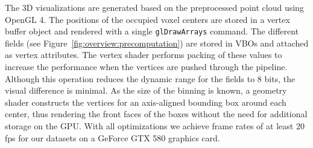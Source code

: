 \documentclass[conference,10pt,letter]{IEEEtran}
\begin{document}
 The 3D visualizations are generated based on the preprocessed point cloud using OpenGL 4. The positions of the occupied voxel centers are stored in a vertex buffer object and rendered with a single \texttt{glDrawArrays} command. The different fields (see Figure~\ref{fig:overview:precomputation}) are stored in VBOs and attached as vertex attributes. The vertex shader performs packing of these values to increase the performance when the vertices are pushed through the pipeline. Although this operation reduces the dynamic range for the fields to 8 bits, the visual difference is minimal. As the size of the binning is known, a geometry shader constructs the vertices for an axis-aligned bounding box around each center, thus rendering the front faces of the boxes without the need for additional storage on the GPU. With all optimizations we achieve frame rates of at least $20$\,fps for our datasets on a GeForce GTX 580 graphics card.

\end{document}
